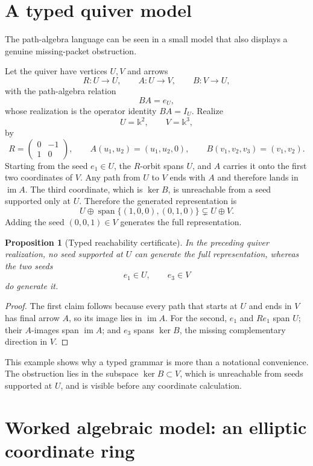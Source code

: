 \documentclass[11pt]{article}
\newtheorem{proposition}[theorem]{Proposition}
\theoremstyle{definition}
\theoremstyle{remark}
\newcommand{\Span}{\operatorname{span}}
\newcommand{\im}{\operatorname{im}}
\newcommand{\bbk}{\mathbb{k}}
\begin{document}
\section{A typed quiver model}

The path-algebra language can be seen in a small model that also displays a genuine missing-packet obstruction.

Let the quiver have vertices $U,V$ and arrows
\[
R:U\to U,
\qquad
A:U\to V,
\qquad
B:V\to U,
\]
with the path-algebra relation
\[
BA=e_U,
\]
whose realization is the operator identity $BA=I_U$.
Realize
\[
U=\bbk^2,
\qquad
V=\bbk^3,
\]
by
\[
R=
\begin{pmatrix}0&-1\\1&0\end{pmatrix},
\qquad
A(u_1,u_2)=(u_1,u_2,0),
\qquad
B(v_1,v_2,v_3)=(v_1,v_2).
\]
Starting from the seed $e_1\in U$, the $R$-orbit spans $U$, and $A$ carries it onto the first two coordinates of $V$. Any path from $U$ to $V$ ends with $A$ and therefore lands in $\im A$. The third coordinate, which is $\ker B$, is unreachable from a seed supported only at $U$. Therefore the generated representation is
\[
U\oplus\Span\{(1,0,0),(0,1,0)\}
\subsetneq U\oplus V.
\]
Adding the seed $(0,0,1)\in V$ generates the full representation.

\begin{proposition}[Typed reachability certificate]
\label{prop:typed-reachability}
In the preceding quiver realization, no seed supported at $U$ can generate the full representation, whereas the two seeds
\[
e_1\in U,
\qquad
e_3\in V
\]
do generate it.
\end{proposition}

\begin{proof}
The first claim follows because every path that starts at $U$ and ends in $V$ has final arrow $A$, so its image lies in $\im A$. For the second, $e_1$ and $Re_1$ span $U$; their $A$-images span $\im A$; and $e_3$ spans $\ker B$, the missing complementary direction in $V$.
\end{proof}

This example shows why a typed grammar is more than a notational convenience. The obstruction lies in the subspace $\ker B\subset V$, which is unreachable from seeds supported at $U$, and is visible before any coordinate calculation.

\section{Worked algebraic model: an elliptic coordinate ring}
\end{document}
